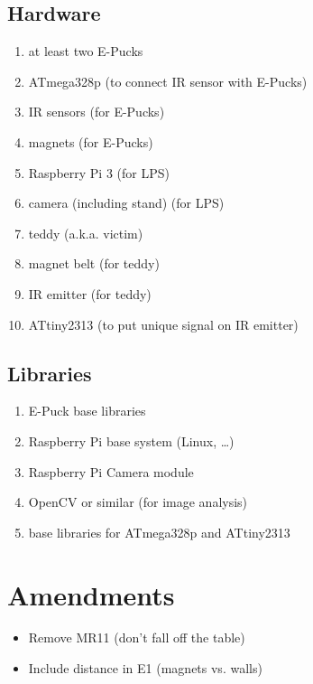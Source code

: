 \documentclass[a4paper,parskip,headheight=38pt]{scrartcl} %
\begin{document}
\subsection{Hardware}
\begin{enumerate}[label=\hardware]
\item at least two E-Pucks
\item ATmega328p (to connect IR sensor with E-Pucks)
\item IR sensors (for E-Pucks)
\item magnets (for E-Pucks)
\item Raspberry Pi 3 (for LPS)
\item camera (including stand) (for LPS)
\item teddy (a.k.a. victim)
\item magnet belt (for teddy)
\item IR emitter (for teddy)
\item ATtiny2313 (to put unique signal on IR emitter)
\end{enumerate}

\subsection{Libraries}
\begin{enumerate}[label=\libs]
\item E-Puck base libraries
\item Raspberry Pi base system (Linux, \ldots)
\item Raspberry Pi Camera module
\item OpenCV or similar (for image analysis)
\item base libraries for ATmega328p and ATtiny2313
\end{enumerate}


\section{Amendments}

\begin{itemize}
    \item Remove MR11 (don't fall off the table)
    \item Include distance in E1 (magnets vs. walls)
\end{itemize}
\end{document}
